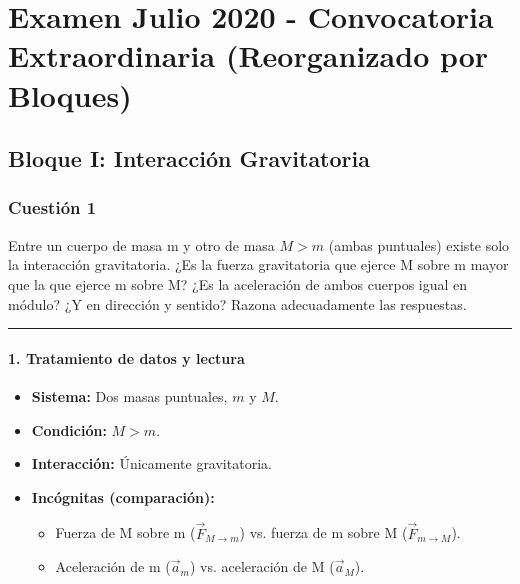 \chapter{Examen Julio 2020 - Convocatoria Extraordinaria (Reorganizado por Bloques)}
\label{chap:2020_jul_ext_bloques}

\section{Bloque I: Interacción Gravitatoria}
\label{sec:grav_2020_jul_ext}

\subsection{Cuestión 1}
\label{subsec:C1_2020_jul_ext_b}

\begin{cajaenunciado}
Entre un cuerpo de masa m y otro de masa $M>m$ (ambas puntuales) existe solo la interacción gravitatoria. ¿Es la fuerza gravitatoria que ejerce M sobre m mayor que la que ejerce m sobre M? ¿Es la aceleración de ambos cuerpos igual en módulo? ¿Y en dirección y sentido? Razona adecuadamente las respuestas.
\end{cajaenunciado}
\hrule

\subsubsection*{1. Tratamiento de datos y lectura}
\begin{itemize}
    \item \textbf{Sistema:} Dos masas puntuales, $m$ y $M$.
    \item \textbf{Condición:} $M > m$.
    \item \textbf{Interacción:} Únicamente gravitatoria.
    \item \textbf{Incógnitas (comparación):}
    \begin{itemize}
        \item Fuerza de M sobre m ($\vec{F}_{M \to m}$) vs. fuerza de m sobre M ($\vec{F}_{m \to M}$).
        \item Aceleración de m ($\vec{a}_m$) vs. aceleración de M ($\vec{a}_M$).
    \end{itemize}
\end{itemize}


